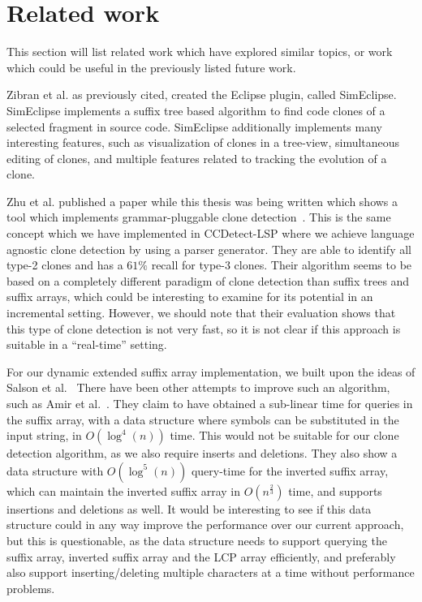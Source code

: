 \section{Related work}

This section will list related work which have explored similar topics, or work which
could be useful in the previously listed future work.

Zibran et al. as previously cited, created the Eclipse plugin, called
SimEclipse\cite{Udding_Towards_Convenient_Management}. SimEclipse implements a suffix tree
based algorithm to find code clones of a selected fragment in source
code\cite{Zibran_real_time_search}. SimEclipse additionally implements many interesting
features, such as visualization of clones in a tree-view, simultaneous editing of clones,
and multiple features related to tracking the evolution of a clone.

Zhu et al. published a paper while this thesis was being written which shows a tool which
implements grammar-pluggable clone detection~\cite{GrammarPluggableCloneDetection}. This
is the same concept which we have implemented in CCDetect-LSP where we achieve language
agnostic clone detection by using a parser generator. They are able to identify all type-2
clones and has a $61\%$ recall for type-3 clones. Their algorithm seems to be based on a
completely different paradigm of clone detection than suffix trees and suffix arrays,
which could be interesting to examine for its potential in an incremental setting.
However, we should note that their evaluation shows that this type of clone detection is
not very fast, so it is not clear if this approach is suitable in a ``real-time'' setting.

For our dynamic extended suffix array implementation, we built upon the ideas of Salson et
al.~\cite{DynamicExtendedSuffixArrays, DynamicExtendedSuffixArraysReorderings, DynamicBWT}
There have been other attempts to improve such an algorithm, such as Amir et
al.~\cite{AmirDynamicSuffixWithPoly}. They claim to have obtained a sub-linear time for
queries in the suffix array, with a data structure where symbols can be substituted in the
input string, in $O(\log^4(n))$ time. This would not be suitable for our clone detection
algorithm, as we also require inserts and deletions. They also show a data structure with
$O(\log^5(n))$ query-time for the inverted suffix array, which can maintain the inverted
suffix array in $O(n^{\frac{2}{3}})$ time, and supports insertions and deletions as well.
It would be interesting to see if this data structure could in any way improve the
performance over our current approach, but this is questionable, as the data structure
needs to support querying the suffix array, inverted suffix array and the LCP array
efficiently, and preferably also support inserting/deleting multiple characters at a time
without performance problems.

